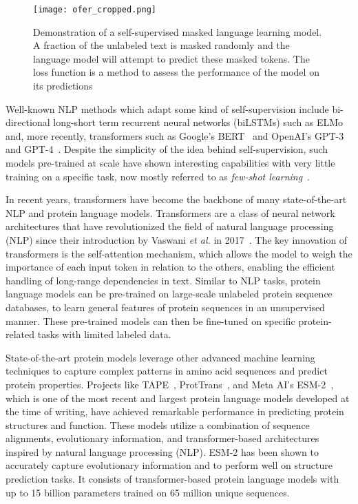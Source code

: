 \begin{figure}[!ht]
    \centering
    \texttt{[image: ofer\_cropped.png]}
    \caption{Demonstration of a self-supervised masked language learning model. A fraction of the unlabeled text is masked randomly and the language model will attempt to predict these masked tokens. The loss function is a method to assess the performance of the model on its predictions}
    \label{fig:ofer}
\end{figure}

Well-known NLP methods which adapt some kind of self-supervision include bi-directional long-short term recurrent neural networks (biLSTMs) such as ELMo~\cite{elmo} and, more recently, transformers such as Google's BERT~\cite{bert} and OpenAI's GPT-3~\cite{gpt3} and GPT-4~\cite{gpt4}. Despite the simplicity of the idea behind self-supervision, such models pre-trained at scale have shown interesting capabilities with very little training on a specific task, now mostly referred to as \textit{few-shot learning}~\cite{review}. 

In recent years, transformers have become the backbone of many state-of-the-art NLP and protein language models. Transformers are a class of neural network architectures that have revolutionized the field of natural language processing (NLP) since their introduction by Vaswani \textit{et al.} in 2017~\cite{transfor}. The key innovation of transformers is the self-attention mechanism, which allows the model to weigh the importance of each input token in relation to the others, enabling the efficient handling of long-range dependencies in text. Similar to NLP tasks, protein language models can be pre-trained on large-scale unlabeled protein sequence databases, to learn general features of protein sequences in an unsupervised manner. These pre-trained models can then be fine-tuned on specific protein-related tasks with limited labeled data.

State-of-the-art protein models leverage other advanced machine learning techniques to capture complex patterns in amino acid sequences and predict protein properties. Projects like TAPE~\cite{tape}, ProtTrans~\cite{prottrans}, and Meta AI's ESM-2~\cite{esm2}, which is one of the most recent and largest protein language models developed at the time of writing, have achieved remarkable performance in predicting protein structures and function. These models utilize a combination of sequence alignments, evolutionary information, and transformer-based architectures inspired by natural language processing (NLP). ESM-2 has been shown to accurately capture evolutionary information and to perform well on structure prediction tasks. It consists of transformer-based protein language models with up to 15 billion parameters trained on 65 million unique sequences.

